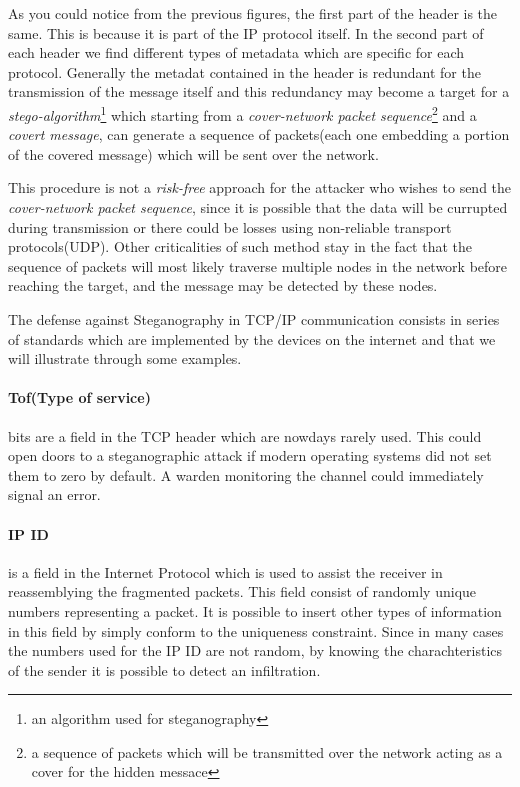 \documentclass[../../main.tex]{subfiles}
\begin{document}
    As you could notice from the previous figures, the first part of the header
    is the same. This is because it is part of the IP protocol itself.
    In the second part of each header we find different types of metadata which
    are specific for each protocol. Generally the metadat contained in the
    header is redundant for the transmission of the message itself and this 
    redundancy may become a target for a \emph{stego-algorithm}\footnote{an
    algorithm used for steganography} which starting from a \emph{cover-network
    packet sequence}\footnote{a sequence of packets which will be transmitted
    over the network acting as a cover for the hidden messace} and a
    \emph{covert message}, can generate a sequence of packets(each one embedding
    a portion of the covered message) which will be sent over the network.

    This procedure is not a \emph{risk-free} approach for the attacker who
    wishes to send the \emph{cover-network packet sequence}, since it is
    possible that the data will be currupted during transmission or there could
    be losses using non-reliable transport protocols(UDP).
    Other criticalities of such method stay in the fact that the sequence of
    packets will most likely traverse multiple nodes in the network before
    reaching the target, and the message may be detected by these nodes.

    The defense against Steganography in TCP/IP communication consists in 
    series of standards which are implemented by the devices on the internet and
    that we will illustrate through some examples.


    \paragraph{Tof(Type of service)} bits are a field in the TCP header which are
    nowdays rarely used. This could open doors to a steganographic attack if
    modern operating systems did not set them to zero by default.
    A warden monitoring the channel could immediately signal an error.

    \paragraph{IP ID} is a field in the Internet Protocol which is used to assist
    the receiver in reassemblying the fragmented packets.
    This field consist of randomly unique numbers representing a packet.
    It is possible to insert other types of information in this field by simply
    conform to the uniqueness constraint.
    Since in many cases the numbers used for the IP ID are not random, by
    knowing the charachteristics of the sender it is possible to detect an
    infiltration.
\end{document}
